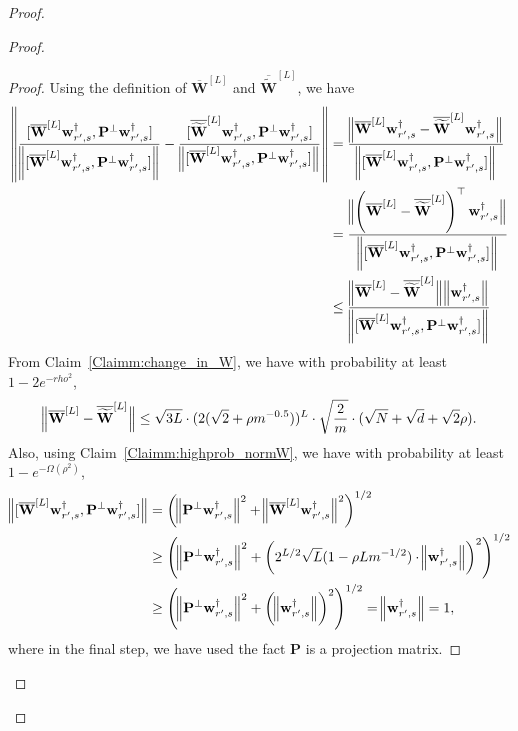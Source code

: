 \begin{claim}
\begin{proof}
\begin{proof}
					\begin{proof}
						Using the definition of $\overline{\mathbf{W}}^{[L]}$ and $\overline{\widetilde{\mathbf{W}}}^{[L]}$, we have
						\begin{align*}
							\norm{\frac{[\overline{\mathbf{W}}^{[L]} \mathbf{w}_{r', s}^{\dagger}, \mathbf{P}^{\perp}\mathbf{w}_{r', s}^{\dagger}]}{\norm{[\overline{\mathbf{W}}^{[L]} \mathbf{w}_{r', s}^{\dagger}, \mathbf{P}^{\perp}\mathbf{w}_{r', s}^{\dagger}]}} - \frac{[\overline{\widetilde{\mathbf{W}}}^{[L]} \mathbf{w}_{r', s}^{\dagger}, \mathbf{P}^{\perp}\mathbf{w}_{r', s}^{\dagger}]}{\norm[2]{[\overline{\mathbf{W}}^{[L]} \mathbf{w}_{r', s}^{\dagger}, \mathbf{P}^{\perp}\mathbf{w}_{r', s}^{\dagger}]}}} 
							&= \frac{\norm[2]{\overline{\mathbf{W}}^{[L]} \mathbf{w}_{r', s}^{\dagger} -  \overline{\widetilde{\mathbf{W}}}^{[L]} \mathbf{w}_{r', s}^{\dagger}}}
							{\norm{[\overline{\mathbf{W}}^{[L]} \mathbf{w}_{r', s}^{\dagger}, \mathbf{P}^{\perp}\mathbf{w}_{r', s}^{\dagger}]} } \\&
							= \frac{\norm[2]{\left(\overline{\mathbf{W}}^{[L]} -  \overline{\widetilde{\mathbf{W}}}^{[L]}\right)^{\top} \mathbf{w}_{r', s}^{\dagger} }}
							{\norm{[\overline{\mathbf{W}}^{[L]} \mathbf{w}_{r', s}^{\dagger}, \mathbf{P}^{\perp}\mathbf{w}_{r', s}^{\dagger}]} } \\&
							\le \frac{\norm[2]{\overline{\mathbf{W}}^{[L]} -  \overline{\widetilde{\mathbf{W}}}^{[L]}} \norm{\mathbf{w}_{r', s}^{\dagger} }}
							{\norm{[\overline{\mathbf{W}}^{[L]} \mathbf{w}_{r', s}^{\dagger}, \mathbf{P}^{\perp}\mathbf{w}_{r', s}^{\dagger}]} } 
						\end{align*}
						From Claim~\ref{Claimm:change_in_W}, we have with probability at least $1-2e^{-rho^2}$,
						\begin{align*}
							\norm[2]{\overline{\mathbf{W}}^{[L]} -  \overline{\widetilde{\mathbf{W}}}^{[L]}} \le \sqrt{3L} \cdot (2 (\sqrt{2} + \rho m^{-0.5}))^{L} \cdot \sqrt{\frac{2}{m}} \cdot   (\sqrt{N} + \sqrt{d} + \sqrt{2}\rho).
						\end{align*}
						Also, using Claim~\ref{Claimm:highprob_normW}, we have with probability at least $1-e^{-\Omega(\rho^2)}$,
						\begin{align*}
							\norm[2]{[\overline{\mathbf{W}}^{[L]} \mathbf{w}_{r', s}^{\dagger}, \mathbf{P}^{\perp}\mathbf{w}_{r', s}^{\dagger}]} &= \left(\norm[2]{\mathbf{P}^{\perp}\mathbf{w}_{r', s}^{\dagger}}^2 + \norm[2]{\overline{\mathbf{W}}^{[L]} \mathbf{w}_{r', s}^{\dagger}}^2 \right)^{1/2} \\&
							\ge \left(\norm[2]{\mathbf{P}^{\perp}\mathbf{w}_{r', s}^{\dagger}}^2 + \left(2^{L/2} \sqrt{L} (1 -  \rho L m^{-1/2}) \cdot \norm[2]{\mathbf{w}_{r', s}^{\dagger}}\right)^2 \right)^{1/2} \\&
							\ge \left(\norm[2]{\mathbf{P}^{\perp}\mathbf{w}_{r', s}^{\dagger}}^2 + \left(\norm[2]{\mathbf{w}_{r', s}^{\dagger}}\right)^2 \right)^{1/2} = \norm[2]{\mathbf{w}_{r', s}^{\dagger}} = 1,
						\end{align*}
						where in the final step, we have used the fact $\mathbf{P}$ is a projection matrix.
						

\end{proof}
\end{proof}
\end{proof}
\end{claim}
